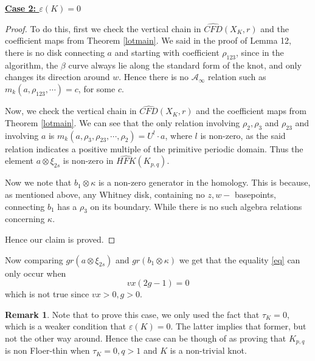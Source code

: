 \documentclass[11pt,reqno]{amsart}
\theoremstyle{definition}
\newtheorem *{remark}{Remark}
\newcommand{\hfkhat}{\widehat{\mathit{HFK}}}
\newcommand{\cfdhat}{\widehat{\mathit{CFD}}}
\begin{document}
\begin{subsection}{\underline{\textbf{Case 2: $\varepsilon(K)=0$}}}
\begin{proof}
To do this, first we check the vertical chain in $\cfdhat(X_K,r)$ and the coefficient maps from Theorem \ref{lotmain}. We said in the proof of Lemma 12, there is no disk connecting $a$ and starting with coefficient $\rho_{123}$, since in the algorithm, the $\beta$ curve always lie along the standard form of the knot, and only changes its direction around $w$. Hence there is no $\mathcal{A}_{\infty}$ relation such as $m_k(a,\rho_{123},\cdots) = c$, for some $c$.

Now, we check the vertical chain in $\cfdhat(X_K,r)$ and the coefficient maps from Theorem \ref{lotmain}. We can see that the only relation involving $\rho_2, \rho_3$ and $ \rho_{23}$ and involving $a$ is $m_k(a, \rho_3, \rho_{23}, \cdots, \rho_2) = U^{l} \cdot a$, where $l$ is non-zero, as the said relation indicates a positive multiple of the primitive periodic domain. Thus the element $a \otimes \xi_{2s}$ is non-zero in $\hfkhat(K_{p,q})$.

Now we note that $b_1\otimes \kappa$ is a non-zero generator in the homology. This is because, as mentioned above, any Whitney disk, containing no $z, w-$ basepoints, connecting $b_1$ has a $\rho_3$ on its boundary. While there is no such algebra relations concerning $\kappa$.

Hence our claim is proved.
\end{proof}





Now comparing $gr(a \otimes \xi_{2s})$ and $gr(b_1 \otimes \kappa)$ we get that the equality \ref{eq} can only occur when \[ vx(2g-1) = 0\] which is not true since $vx >0, g>0$.

\begin{remark}
\label{tau0}
Note that to prove this case, we only used the fact that $\tau_K = 0$, which is a weaker condition that $\varepsilon(K) = 0$. The latter implies that former, but not the other way around. Hence the case can be though of as proving that $K_{p,q}$ is non Floer-thin when $\tau_K = 0, q>1$ and $K$ is a non-trivial knot.
    
\end{remark}

    
\end{subsection}
\end{document}
